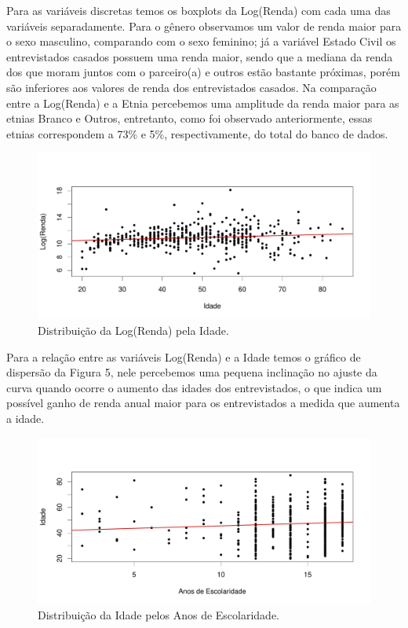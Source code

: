 \documentclass[]{article}
\begin{document}
Para as variáveis discretas temos os boxplots da Log(Renda) com cada uma
das variáveis separadamente. Para o gênero observamos um valor de renda
maior para o sexo masculino, comparando com o sexo feminino; já a
variável Estado Civil os entrevistados casados possuem uma renda maior,
sendo que a mediana da renda dos que moram juntos com o parceiro(a) e
outros estão bastante próximas, porém são inferiores aos valores de
renda dos entrevistados casados. Na comparação entre a Log(Renda) e a
Etnia percebemos uma amplitude da renda maior para as etnias Branco e
Outros, entretanto, como foi observado anteriormente, essas etnias
correspondem a 73\% e 5\%, respectivamente, do total do banco de dados.

\begin{figure}[H]

{\centering \includegraphics[width=0.6\linewidth]{p12-graf} 

}

\caption{Distribuição da Log(Renda) pela Idade.}\label{fig:unnamed-chunk-12}
\end{figure}

Para a relação entre as variáveis Log(Renda) e a Idade temos o gráfico
de dispersão da Figura 5, nele percebemos uma pequena inclinação no
ajuste da curva quando ocorre o aumento das idades dos entrevistados, o
que indica um possível ganho de renda anual maior para os entrevistados
a medida que aumenta a idade.

\begin{figure}[H]

{\centering \includegraphics[width=0.6\linewidth]{p27-graf} 

}

\caption{Distribuição da Idade pelos Anos de Escolaridade.}\label{fig:unnamed-chunk-13}
\end{figure}
\end{document}
